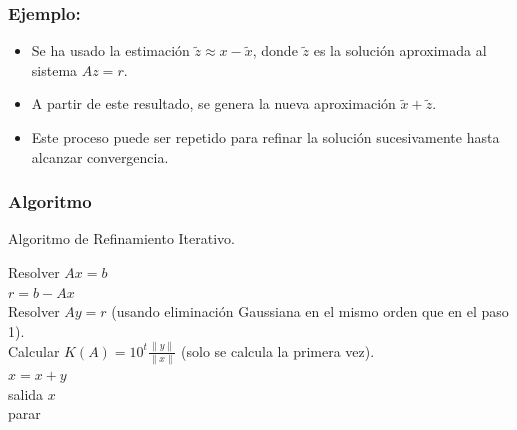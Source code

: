 \documentclass[10pt]{beamer}
\begin{document}
  \begin{frame}
    \frametitle{Ejemplo:}
    \begin{itemize}
      \item<1-> Se ha usado la estimaci\'on $\tilde z \approx x - \tilde x$, donde $\tilde z$ es la soluci\'on aproximada al sistema $A z = r$.
      \item<2-> A partir de este resultado, se genera la nueva aproximaci\'on $\tilde x + \tilde z$.
      \item<3-> Este proceso puede ser repetido para refinar la soluci\'on sucesivamente hasta alcanzar convergencia.
    \end{itemize}
  \end{frame}
  \begin{frame}    
    \frametitle{Algoritmo}
    \small
\begin{algorithm}[H]
 \caption{Algoritmo de Refinamiento Iterativo.}
 \BlankLine
 Resolver $Ax=b$\\
 {
  $r=b-Ax$\\
  Resolver $Ay=r$ (usando eliminaci\'on Gaussiana en el mismo orden que en el paso 1).\\
  Calcular $K(A) = 10^t\displaystyle\frac{\|y\|}{\|x\|}$ (solo se calcula la primera vez).\\
  $x=x+y$\\
  {
    salida $x$\\
    parar
  }
 }
\end{algorithm}
  \end{frame}
\end{document}
